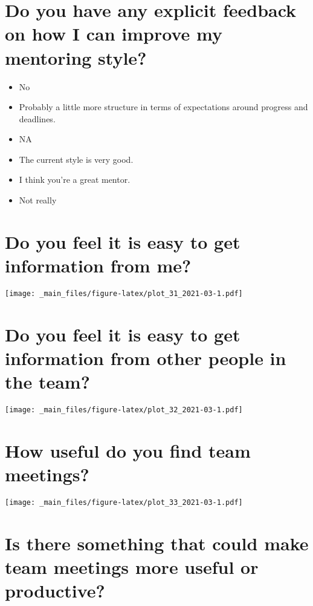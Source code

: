 \documentclass[
]{book}
\providecommand{\tightlist}{%
  \setlength{\itemsep}{0pt}\setlength{\parskip}{0pt}}
\begin{document}
\hypertarget{do-you-have-any-explicit-feedback-on-how-i-can-improve-my-mentoring-style-1}{%
\section{Do you have any explicit feedback on how I can improve my mentoring style?}\label{do-you-have-any-explicit-feedback-on-how-i-can-improve-my-mentoring-style-1}}

\begin{itemize}
\tightlist
\item
  No
\item
  Probably a little more structure in terms of expectations around progress and deadlines.
\item
  NA
\item
  The current style is very good.
\item
  I think you're a great mentor.
\item
  Not really
\end{itemize}

\hypertarget{do-you-feel-it-is-easy-to-get-information-from-me-1}{%
\section{Do you feel it is easy to get information from me?}\label{do-you-feel-it-is-easy-to-get-information-from-me-1}}

\texttt{[image: \_main\_files/figure-latex/plot\_31\_2021-03-1.pdf]}

\hypertarget{do-you-feel-it-is-easy-to-get-information-from-other-people-in-the-team-1}{%
\section{Do you feel it is easy to get information from other people in the team?}\label{do-you-feel-it-is-easy-to-get-information-from-other-people-in-the-team-1}}

\texttt{[image: \_main\_files/figure-latex/plot\_32\_2021-03-1.pdf]}

\hypertarget{how-useful-do-you-find-team-meetings-1}{%
\section{How useful do you find team meetings?}\label{how-useful-do-you-find-team-meetings-1}}

\texttt{[image: \_main\_files/figure-latex/plot\_33\_2021-03-1.pdf]}

\hypertarget{is-there-something-that-could-make-team-meetings-more-useful-or-productive-1}{%
\section{Is there something that could make team meetings more useful or productive?}\label{is-there-something-that-could-make-team-meetings-more-useful-or-productive-1}}
\end{document}
